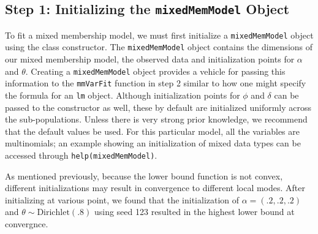 \documentclass{article}\usepackage[]{graphicx}\usepackage[]{color}
\begin{document}
\subsection*{Step 1: Initializing the \texttt{mixedMemModel} Object}
To fit a mixed membership model, we must first initialize a \texttt{mixedMemModel} object using the class constructor. The \texttt{mixedMemModel} object contains the dimensions of our mixed membership model, the observed data and initialization points for $\alpha$ and $\theta$. Creating a \texttt{mixedMemModel} object provides a vehicle for passing this information to the \texttt{mmVarFit} function in step 2 similar to how one might specify the formula for an \texttt{lm} object. Although initialization points for $\phi$ and $\delta$ can be passed to the constructor as well, these by default are initialized uniformly across the sub-populations. Unless there is very strong prior knowledge, we recommend that the default values be used. For this particular model, all the variables are multinomials; an example showing an initialization of mixed data types can be accessed through \texttt{help(mixedMemModel)}.

As mentioned previously, because the lower bound function is not convex, different initializations may result in convergence to different local modes. After initializing at various point, we found that the initialization of $\alpha = \left(.2, .2, .2\right)$ and $\theta \sim \text{Dirichlet}(.8)$ using seed 123 resulted in the highest lower bound at convergnce.  
\end{document}
